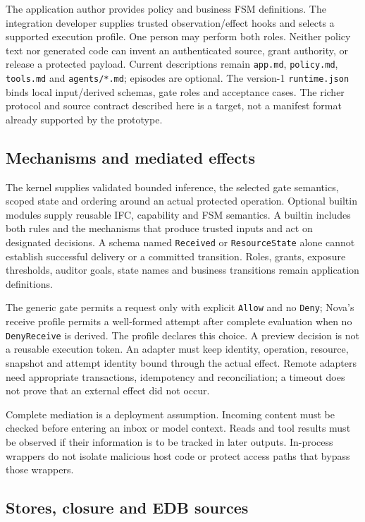 \documentclass[10pt]{article}
\begin{document}
The application author provides policy and business FSM definitions. The integration
developer supplies trusted observation/effect hooks and selects a supported execution
profile. One person may perform both roles. Neither policy text nor generated code can
invent an authenticated source, grant authority, or release a protected payload.
Current descriptions remain \texttt{app.md}, \texttt{policy.md}, \texttt{tools.md} and
\texttt{agents/*.md}; episodes are optional. The version-1 \texttt{runtime.json} binds
local input/derived schemas, gate roles and acceptance cases. The richer protocol and
source contract described here is a target, not a manifest format already supported
by the prototype.

\subsection{Mechanisms and mediated effects}

The kernel supplies validated bounded inference, the selected gate semantics, scoped
state and ordering around an actual protected operation. Optional builtin modules
supply reusable IFC, capability and FSM semantics. A builtin includes both rules and
the mechanisms that produce trusted inputs and act on designated decisions. A schema
named \texttt{Received} or \texttt{ResourceState} alone cannot establish successful
delivery or a committed transition. Roles, grants, exposure thresholds, auditor goals,
state names and business transitions remain application definitions.

The generic gate permits a request only with explicit \texttt{Allow} and no
\texttt{Deny}; Nova's receive profile permits a well-formed attempt after complete
evaluation when no \texttt{DenyReceive} is derived. The profile declares this choice.
A preview decision is not a reusable execution token. An adapter must keep identity,
operation, resource, snapshot and attempt identity bound through the actual effect.
Remote adapters need appropriate transactions, idempotency and reconciliation; a
timeout does not prove that an external effect did not occur.

Complete mediation is a deployment assumption. Incoming content must be checked
before entering an inbox or model context. Reads and tool results must be observed
if their information is to be tracked in later outputs. In-process wrappers do not
isolate malicious host code or protect access paths that bypass those wrappers.

\subsection{Stores, closure and EDB sources}
\end{document}
